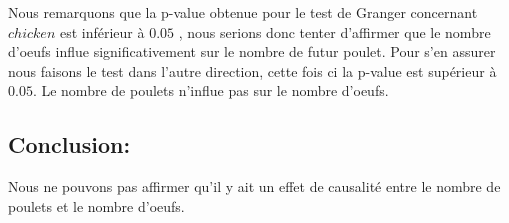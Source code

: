 \documentclass{article}
\begin{document}
Nous remarquons que la p-value obtenue pour le test de Granger concernant $chicken$ est inférieur à $0.05$ , nous serions donc tenter d'affirmer que le nombre d'oeufs influe significativement sur le nombre de futur poulet. Pour s'en assurer nous faisons le test dans l'autre direction, cette fois ci la p-value est supérieur à $0.05$. Le nombre de poulets n'influe pas sur le nombre d'oeufs.

\subsection{Conclusion:}

Nous ne pouvons pas affirmer qu'il y ait un effet de causalité entre le nombre de poulets et le nombre d'oeufs.
\end{document}

